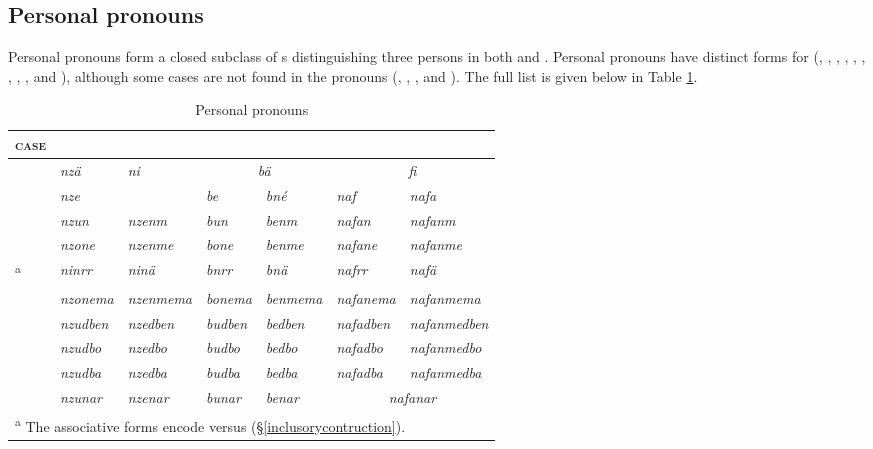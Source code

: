 \subsection{Personal pronouns} \label{personalpron}

Personal pronouns form a closed subclass of s distinguishing three persons in both  and  . Personal pronouns have distinct forms for  (, , , , , , , , , and ), although some cases are not found in the pronouns (, , , and ). The full list is given below in Table \ref{perspron}.

\begin{table}
\begin{tabularx}{\textwidth}{Xllllll}
	\lsptoprule
	\textsc{case}&\Fsg{}&\Fnsg{}&\Ssg{}&\Snsg{}&\Tsg{}&\Tnsg{}\\ 
	\hline
	\Abs{}&\multicolumn{1}{l|}{\emph{nzä}}&\multirow{2}{*}{\emph{ni}}&\multicolumn{2}{|c|}{\emph{bä}\hspace{.5cm}}&\multicolumn{2}{c|}{\emph{fi}}\\\cline{4-5}\cline{6-7}
	\Erg{}&\multicolumn{1}{l|}{\emph{nze}}&&\multicolumn{1}{|l}{\emph{be}}&\emph{bné}&\emph{naf}&\emph{nafa}\\\cline{3-3}
	\Dat{}&\emph{nzun}&\emph{nzenm}&\emph{bun}&\emph{benm}&\emph{nafan}&\emph{nafanm}\\
	\Poss{}&\emph{nzone}&\emph{nzenme}&\emph{bone}&\emph{benme}&\emph{nafane}&\emph{nafanme}\\
	\Assoc{}\textsuperscript{a}&\emph{ninrr}&\emph{ninä}&\emph{bnrr}&\emph{bnä}&\emph{nafrr}&\emph{nafä}\\
	\Char{}&\emph{nzonema}&\emph{nzenmema}&\emph{bonema}&\emph{benmema}&\emph{nafanema}&\emph{nafanmema}\\
	\Loc{}&\emph{nzudben}&\emph{nzedben}&\emph{budben}&\emph{bedben}&\emph{nafadben}&\emph{nafanmedben}\\
	\All{}&\emph{nzudbo}&\emph{nzedbo}&\emph{budbo}&\emph{bedbo}&\emph{nafadbo}&\emph{nafanmedbo}\\
	\Abl{}&\emph{nzudba}&\emph{nzedba}&\emph{budba}&\emph{bedba}&\emph{nafadba}&\emph{nafanmedba}\\\cline{6-7}
	\Purp{}&\emph{nzunar}&\emph{nzenar}&\emph{bunar}&\emph{benar}&\multicolumn{2}{|c|}{\emph{nafanar}}\\
	\hline 
	\bottomrule
	\multicolumn{7}{l}{\footnotesize{\textsuperscript{a} The associative forms encode \Du{} versus \Pl{} (\S{}\ref{inclusorycontruction}).}}\\
\end{tabularx}
\caption{Personal pronouns}
\label{perspron}
\end{table}


